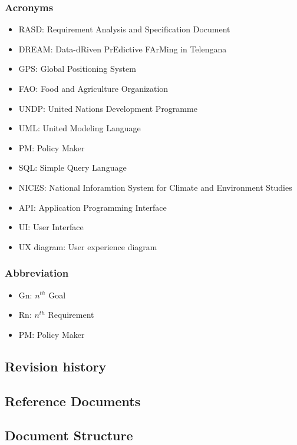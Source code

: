 \subsubsection{Acronyms}
\begin{itemize}
	\item RASD: Requirement Analysis and Specification Document
	\item DREAM: Data-dRiven PrEdictive FArMing in
Telengana
	\item GPS: Global Positioning System
	\item FAO: Food and Agriculture Organization
	\item UNDP: United Nations Development Programme
	\item UML: United Modeling Language
	\item PM: Policy Maker
	\item SQL: Simple Query Language
	\item NICES: National Inforamtion System for Climate and Environment Studies
	\item API: Application Programming Interface
	\item UI: User Interface
	\item UX diagram: User experience diagram
\end{itemize}

\subsubsection{Abbreviation}
\begin{itemize}
	\item Gn: $n^{th}$ Goal
	\item Rn: $n^{th}$ Requirement
	\item PM: Policy Maker
\end{itemize}

\subsection{Revision history}

\subsection{Reference Documents}
 




\subsection{Document Structure}
